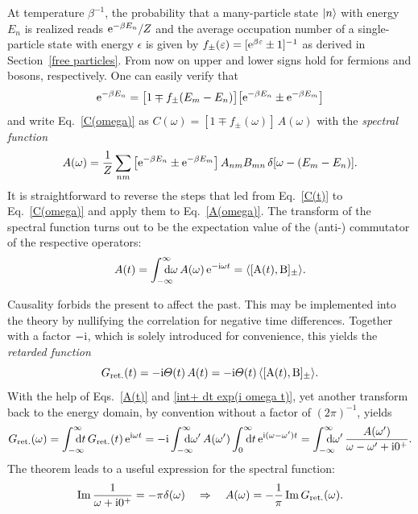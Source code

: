 At temperature $\beta^{-1}$, the probability that a many-particle state $|n\rangle$
with energy $E_n$ is realized reads $\mathrm e^{-\beta E_n} / Z$ and the average
occupation number of a single-particle state with energy $\epsilon$ is given by
$f_\pm(\varepsilon) = [\mathrm e^{\beta \varepsilon} \pm 1]^{-1}$ as derived in
Section~\ref{free particles}. From now on upper and lower signs hold for
fermions and bosons, respectively. One can easily verify that
%
\begin{equation*}
    \mathrm e^{-\beta E_n} =
    \big[ 1 \mp f_\pm(E_m - E_n) \big]
    \big[ \mathrm e^{-\beta E_n} \pm \mathrm e^{-\beta E_m} \big]
\end{equation*}
%
and write Eq.~\ref{C(omega)} as $C(\omega) = [1 \mp f_\pm(\omega)] \, A(\omega)$
with the \emph{spectral function}
%
\begin{equation} \label{A(omega)}
    A(\omega) = \frac 1 Z \sum_{n m} \big[
        \mathrm e^{-\beta E_n} \pm \mathrm e^{-\beta E_m}
    \big] \, A_{n m} B_{m n} \, \delta[\omega - (E_m - E_n)].
\end{equation}
%
It is straightforward to reverse the steps that led from Eq.~\ref{C(t)} to
Eq.~\ref{C(omega)} and apply them to Eq.~\ref{A(omega)}. The 
transform of the spectral function turns out to be the expectation value of the
(anti-) commutator of the respective operators:
%
\begin{equation} \label{A(t)}
    A(t) = \int \from{-\infty} \till \infty \D \omega \,
    A(\omega) \, \E^{-\I \omega t} =
    \av{[\op A(t), \op B]_\pm}.
\end{equation}

Causality forbids the present to affect the past. This may be implemented into
the theory by nullifying the correlation for negative time differences. Together
with a factor $-\mathrm i$, which is solely introduced for convenience, this yields the
\emph{retarded  function}
%
\begin{equation} \label{G_ret(t)}
    G \sb{\text{ret.}} (t) = -\mathrm i \varTheta(t) \, A(t) =
    -\mathrm i \varTheta(t) \, \langle[\mathrm A(t), \mathrm B]_\pm\rangle.
\end{equation}
%
With the help of Eqs.~\ref{A(t)} and \ref{int+ dt exp(i omega t)}, yet another
 transform back to the energy domain, by convention without a
factor of $(2 \pi)^{-1}$, yields
%
\begin{equation} \label{G_ret(omega)}
    G \sub{ret.} (\omega) = \int \from{-\infty} \till \infty \D t \,
    G \sub{ret.} (t) \, \E^{\I \omega t} = -\I
    \int \from{-\infty} \till \infty \D \omega' \, A(\omega')
    \int \from 0 \till \infty \D t \, \E^{\I (\omega - \omega') t} =
    \int \from{-\infty} \till \infty \D \omega' \,
    \frac{A(\omega')}{\omega - \omega' + \I 0^+}.
\end{equation}
%
The  theorem leads to a useful expression for the
spectral function:
%
\begin{equation} \label{spectral representation}
    \operatorname{Im} \frac 1 {\omega + \mathrm i 0^+} = -\pi \delta(\omega)
    \quad \Rightarrow \quad
    A(\omega) = -\frac 1 \pi \operatorname{Im} G \sb{\text{ret.}} (\omega).
\end{equation}

